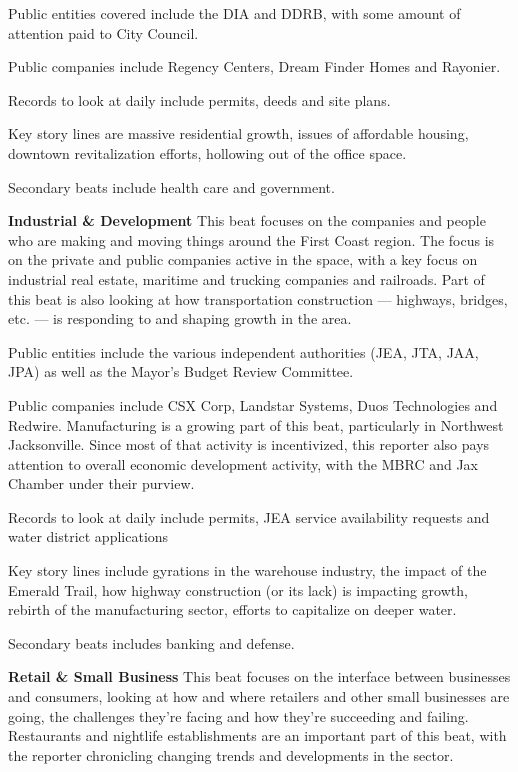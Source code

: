 \documentclass[
  12pt,
  american,
  letterpaperpaper,
  extrafontsizes,onecolumn,openright
  ]{memoir}
\newlength{\rf}
\begin{document}
Public entities covered include the DIA and DDRB, with some amount of attention paid to City Council.

Public companies include Regency Centers, Dream Finder Homes and Rayonier.

Records to look at daily include permits, deeds and site plans.

Key story lines are massive residential growth, issues of affordable housing, downtown revitalization efforts, hollowing out of the office space.

Secondary beats include health care and government.

\textbf{Industrial \& Development}
This beat focuses on the companies and people who are making and moving things around the First Coast region. The focus is on the private and public companies active in the space, with a key focus on industrial real estate, maritime and trucking companies and railroads. Part of this beat is also looking at how transportation construction --- highways, bridges, etc. --- is responding to and shaping growth in the area.

Public entities include the various independent authorities (JEA, JTA, JAA, JPA) as well as the Mayor's Budget Review Committee.

Public companies include CSX Corp, Landstar Systems, Duos Technologies and Redwire. Manufacturing is a growing part of this beat, particularly in Northwest Jacksonville. Since most of that activity is incentivized, this reporter also pays attention to overall economic development activity, with the MBRC and Jax Chamber under their purview.

Records to look at daily include permits, JEA service availability requests and water district applications

Key story lines include gyrations in the warehouse industry, the impact of the Emerald Trail, how highway construction (or its lack) is impacting growth, rebirth of the manufacturing sector, efforts to capitalize on deeper water.

Secondary beats includes banking and defense.

\textbf{Retail \& Small Business}
This beat focuses on the interface between businesses and consumers, looking at how and where retailers and other small businesses are going, the challenges they're facing and how they're succeeding and failing. Restaurants and nightlife establishments are an important part of this beat, with the reporter chronicling changing trends and developments in the sector.
\end{document}
